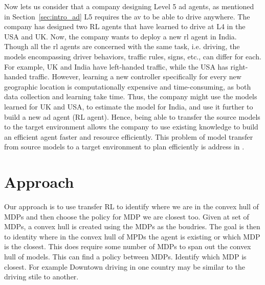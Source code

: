 Now lets us consider that a company designing Level 5 \gls{ad} agents, as mentioned in Section~\ref{sec:intro_ad} L5 requires the \gls{av} to be able to drive anywhere. The company has designed two RL agents that have learned to drive at L4 in the USA and UK. Now, the company wants to deploy a new \gls{rl} agent in India. 
Though all the \gls{rl} agents are concerned with the same task, i.e. driving, the models encompassing driver behaviors, traffic rules, signs, etc., can differ for each. For example, UK and India have left-handed traffic, while the USA has right-handed traffic. However, learning a new controller specifically for every new geographic location is computationally expensive and time-consuming, as both data collection and learning take time. Thus, the company might use the models learned for UK and USA, to estimate the model for India, and use it further to build a new \gls{ad} agent (RL agent). Hence, being able to transfer the source models to the target environment allows the company to use existing knowledge to build an efficient agent faster and resource efficiently. This problem of model transfer from source models to a target environment to plan efficiently is address in \paperTransfer.

\section{Approach}
Our approach is to use transfer RL to identify where we are in the convex hull of MDPs and then choose the policy for MDP we are closest too. 
Given at set of MDPs, a convex hull is created using the MDPs as the boudries. The goal is then to identity where in the convex hull of MPDs the agent is existing or which MDP is the closest. 
This does require some number of MDPs to span out the convex hull of models. 
This can find a policy between MDPs. 
Identify which MDP is closest. For example Downtown driving in one country may be similar to the driving stile to another. 


